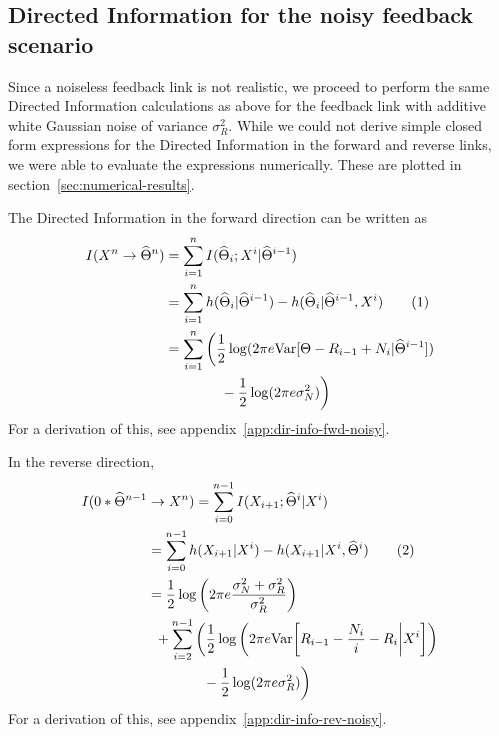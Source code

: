 \documentclass[letterpaper, 10pt, conference]{ieeeconf}
\newcommand\numberthis{\stepcounter{equation}\tag{\theequation}}
\begin{document}

\subsection{Directed Information for the noisy feedback scenario}

Since a noiseless feedback link is not realistic, we proceed to perform the same Directed Information calculations as above for the feedback link with additive white Gaussian noise of variance $\sigma_R^2$. While we could not derive simple closed form expressions for the Directed Information in the forward and reverse links, we were able to evaluate the expressions numerically. These are plotted in section~\ref{sec:numerical-results}.

The Directed Information in the forward direction can be written as
\begin{align*}
	I(X^n \rightarrow \widehat\Theta^n) &= \sum_{i=1}^n{I(\widehat\Theta_i ; X^i | \widehat\Theta^{i-1})} \\
										&= \sum_{i=1}^n{h(\widehat\Theta_i | \widehat\Theta^{i-1}) - h(\widehat\Theta_i | \widehat\Theta^{i-1}, X^i)} \numberthis \label{eq:dir-info-fwd-noisy} \\
										&= \sum_{i=1}^n \bigg( \frac{1}{2} \log(2 \pi e \text{Var}[\Theta - R_{i-1} + N_i | \widehat\Theta^{i-1}]) \\
										& \qquad \qquad - \frac{1}{2}\log(2 \pi e \sigma_N^2) \bigg)
\end{align*}
For a derivation of this, see appendix~\ref{app:dir-info-fwd-noisy}.

In the reverse direction,
\begin{align*}
	I(0*\widehat\Theta^{n-1} & \rightarrow X^n) = \sum_{i=0}^{n-1}{I(X_{i+1}; \widehat\Theta^i | X^i)} \\
							 &= \sum_{i=0}^{n-1}{h(X_{i+1} | X^i) - h(X_{i+1} | X^i, \widehat\Theta^i)} \numberthis \label{eq:dir-info-rev-noisy} \\
							 &= \frac{1}{2} \log \bigg( 2 \pi e \frac{\sigma_N^2 + \sigma_R^2}{\sigma_R^2} \bigg) \\
							 & \; \; + \sum_{i=2}^{n-1} \bigg( \frac{1}{2} \log \bigg( 2 \pi e \text{Var} \bigg[ R_{i-1} - \frac{N_i}{i} - R_i \bigg| X^i \bigg] \bigg) \\
							 & \qquad \qquad - \frac{1}{2} \log( 2 \pi e \sigma_R^2 ) \bigg)
\end{align*}
For a derivation of this, see appendix~\ref{app:dir-info-rev-noisy}.
\end{document}
